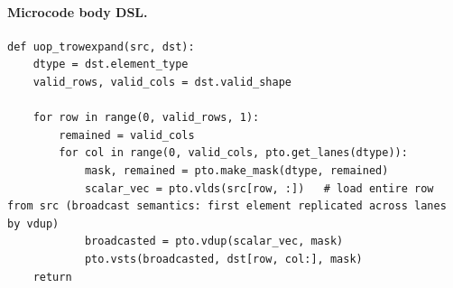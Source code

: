 \paragraph{Microcode body DSL.}
\begin{lstlisting}[style=ptocode]
def uop_trowexpand(src, dst):
    dtype = dst.element_type
    valid_rows, valid_cols = dst.valid_shape

    for row in range(0, valid_rows, 1):
        remained = valid_cols
        for col in range(0, valid_cols, pto.get_lanes(dtype)):
            mask, remained = pto.make_mask(dtype, remained)
            scalar_vec = pto.vlds(src[row, :])   # load entire row from src (broadcast semantics: first element replicated across lanes by vdup)
            broadcasted = pto.vdup(scalar_vec, mask)
            pto.vsts(broadcasted, dst[row, col:], mask)
    return
\end{lstlisting}
\Needspace{0.34\textheight}

